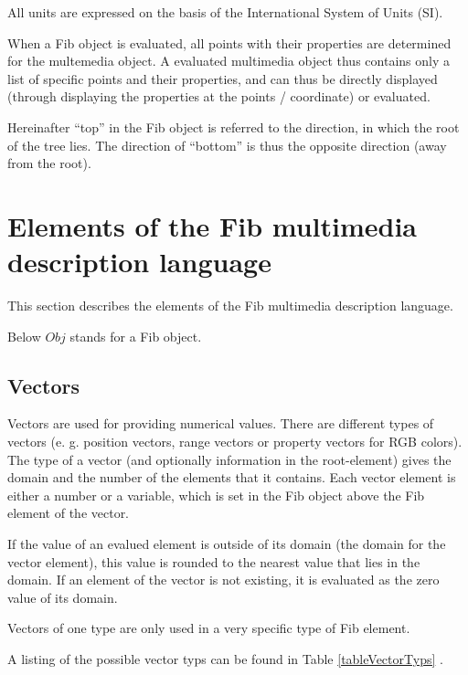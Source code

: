 All units are expressed on the basis of the International System of Units (SI).

When a Fib object is evaluated, all points with their properties are determined for the multemedia object. A evaluated multimedia object thus contains only a list of specific points and their properties, and can thus be directly displayed (through displaying the properties at the points / coordinate) or evaluated.

Hereinafter ``top'' in the Fib object is referred to the direction, in which the root of the tree lies. The direction of ``bottom'' is thus the opposite direction (away from the root).


\section{Elements of the Fib multimedia description language}
\label{secFibElements}

This section describes the elements of the Fib multimedia description language.

Below $Obj$ stands for a Fib object.


\subsection{Vectors}

Vectors are used for providing numerical values. There are different types of vectors (e. g. position vectors, range vectors or property vectors for RGB colors). The type of a vector (and optionally information in the root-element) gives the domain and the number of the elements that it contains.
Each vector element is either a number or a variable, which is set in the Fib object above the Fib element of the vector.

If the value of an evalued element is outside of its domain (the domain for the vector element), this value is rounded to the nearest value that lies in the domain.
If an element of the vector is not existing, it is evaluated as the zero value of its domain.

Vectors of one type are only used in a very specific type of Fib element.

A listing of the possible vector typs can be found in Table \ref{tableVectorTyps} .


